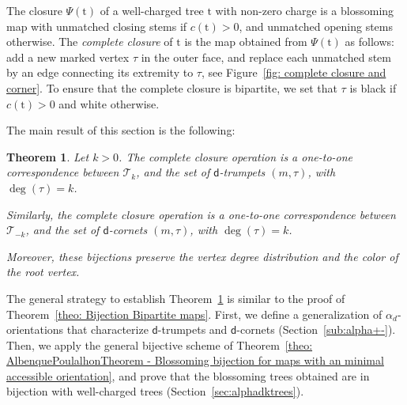 \documentclass[11pt,reqno,tbtags]{amsart}
\renewcommand{\rm}{\mathrm{m}}
\newcommand{\rt}{\mathrm{t}}
\newtheorem{theo}{Theorem}
\newtheorem{coro}[theo]{Corollary}
\numberwithin{equation}{section}
\numberwithin{theo}{section}
\theoremstyle{definition}
\newcommand{\dtrum}{$\mathsf{d}$-trumpet}
\newcommand{\dcorn}{$\mathsf{d}$-cornet}
\begin{document}
\medskip

The closure $\Psi(\rt)$ of a well-charged tree $\rt$ with non-zero charge is a blossoming map with  unmatched closing stems if $c(\rt)>0$, and unmatched opening stems otherwise. The \emph{complete closure} of $\rt$ is the map obtained from $\Psi(\rt)$ as follows: add a new marked vertex $\tau$ in the outer face, and replace each unmatched stem by an edge connecting its extremity to $\tau$, see Figure~\ref{fig: complete closure and corner}. To ensure that the complete closure is bipartite, we set that $\tau$ is black if $c(\rt)>0$ and white otherwise.
\medskip

The main result of this section is the following:
\begin{theo}\label{theo: Bijection well-rooted trees with general charge}
Let $k>0$. The complete closure operation is a one-to-one correspondence between ${\mathcal{T}}_k$, and the set of \dtrum{s} $(m,\tau)$, with $\deg(\tau)=k$.

Similarly, the complete closure operation is a one-to-one correspondence between ${\mathcal{T}}_{-k}$, and the set of \dcorn{s} $(m,\tau)$, with $\deg(\tau)=k$.

Moreover, these bijections preserve the vertex degree distribution and the color of the root vertex. 
\end{theo}






The general strategy to establish Theorem~\ref{theo: Bijection well-rooted trees with general charge} is similar to the proof of Theorem~\ref{theo: Bijection Bipartite maps}. First, we define a generalization of $\alpha_d$-orientations that characterize \dtrum s and \dcorn s (Section~\ref{sub:alpha+-}). Then, we apply the general bijective scheme of Theorem~\ref{theo: AlbenquePoulalhonTheorem - Blossoming bijection for maps with an minimal accessible orientation}, and prove that the blossoming trees obtained are in bijection with well-charged trees (Section~\ref{sec:alphadktrees}).
\end{document}
